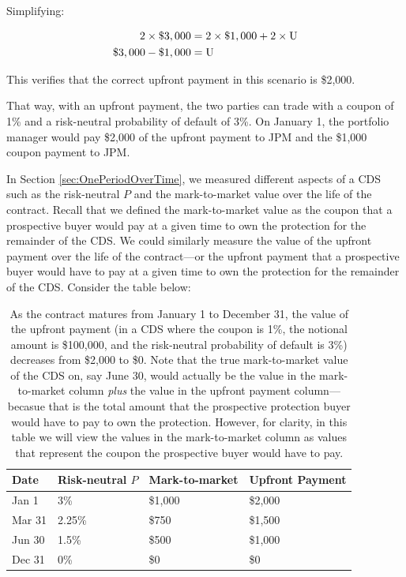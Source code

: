\documentclass{jss}
\begin{document}
Simplifying:


\begin{align}
   \rm 2 \times \$3,000 &= \rm 2 \times \$1,000 + 2 \times U \\
   \rm \$3,000 - \$1,000 &= \rm U
\end{align}

This verifies that the correct upfront payment in this scenario is \$2,000. 

That way, with an upfront payment, the two parties can trade with a coupon of 1\% and a risk-neutral probability of default of 3\%. On January 1, the portfolio manager would pay \$2,000 of the upfront payment to JPM and the \$1,000 coupon payment to JPM.

In Section \ref{sec:OnePeriodOverTime}, we measured different aspects of a CDS such as the risk-neutral $P$ and the mark-to-market value over the life of the contract. Recall that we defined the mark-to-market value as the coupon that a prospective buyer would pay at a given time to own the protection for the remainder of the CDS. We could similarly measure the value of the upfront payment over the life of the contract---or the upfront payment that a prospective buyer would have to pay at a given time to own the protection for the remainder of the CDS. Consider the table below:

\begin{table}[H]
\centering
{\footnotesize
\begin{tabular}{llll}
  \hline
Date & Risk-neutral $P$ & Mark-to-market & Upfront Payment \\ 
  \hline
  Jan 1 & 3\% & \$1,000 & \$2,000  \\ 
  Mar 31 & 2.25\% & \$750 & \$1,500 \\ 
  Jun 30 & 1.5\% & \$500 & \$1,000 \\ 
  Dec 31 & 0\% & \$0 & \$0 \\
   \hline
\end{tabular}
}
\caption{As the contract matures from January 1 to December 31, the value of the upfront payment (in a CDS where the coupon is 1\%, the notional amount is \$100,000, and the risk-neutral probability of default is 3\%) decreases from \$2,000 to \$0. Note that the true mark-to-market value of the CDS on, say June 30, would actually be the value in the mark-to-market column \emph{plus} the value in the upfront payment column---becasue that is the total amount that the prospective protection buyer would have to pay to own the protection. However, for clarity, in this table we will view the values in the mark-to-market column as values that represent the coupon the prospective buyer would have to pay.}
\label{tbl:upfrontValue}
\end{table}
\end{document}
